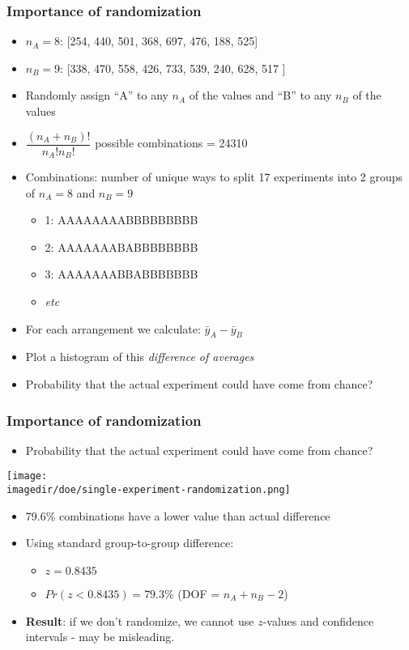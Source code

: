 \begin{frame}\frametitle{Importance of randomization}
	\begin{itemize}
		\item	$n_A = 8$: [254, 440, 501, 368, 697, 476, 188, 525]
		\item	$n_B = 9$: [338, 470, 558, 426, 733, 539, 240, 628, 517 ]
	\end{itemize}
	\begin{itemize}
		\item	Randomly assign ``A'' to any $n_A$ of the values and ``B'' to any $n_B$ of the values
		\item	$\dfrac{(n_A + n_B)!}{n_A! n_B!}$ possible combinations = 24310
		\item	Combinations: number of unique ways to split 17 experiments into 2 groups of $n_A=8$ and $n_B=9$
		\begin{itemize}
			\item	1: AAAAAAAABBBBBBBBB
			\item	2: AAAAAAABABBBBBBBB
			\item	3: AAAAAAABBABBBBBBB
			\item	\emph{etc}
		\end{itemize}
		\item	For each arrangement we calculate: $\bar{y}_A - \bar{y}_B$
		\item	Plot a histogram of this \emph{difference of averages}
		\item	Probability that the actual experiment could have come from chance?
	\end{itemize}
\end{frame}

\begin{frame}\frametitle{Importance of randomization}
	\begin{itemize}
		\item	Probability that the actual experiment could have come from chance?
	\end{itemize}
	\begin{center}
		\texttt{[image: \\imagedir/doe/single-experiment-randomization.png]}
	\end{center}
	\begin{itemize}
		\item	79.6\% combinations have a lower value than actual difference
		\item	Using standard group-to-group difference:
		\begin{itemize}
			\item	$z = 0.8435$
			\item	$Pr(z<0.8435) = 79.3\%$ (DOF = $n_A + n_B - 2$)
		\end{itemize}
	\end{itemize}
	\begin{itemize}
		\item	\textbf{Result}: if we don't randomize, we cannot use $z$-values and confidence intervals - may be misleading.
	\end{itemize}
\end{frame}

